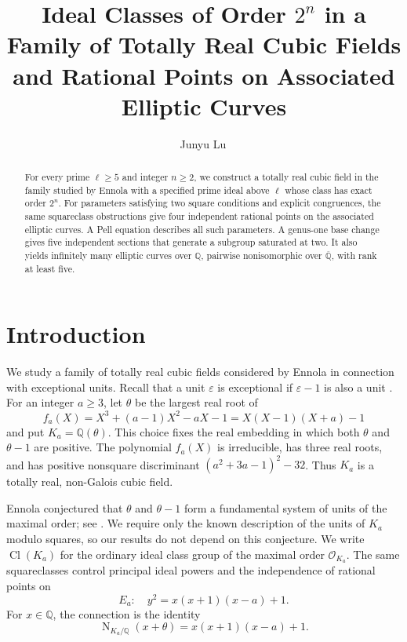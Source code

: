 \documentclass[11pt,leqno,oneside,letterpaper]{amsart}
\title[Ideal classes and rational points]{Ideal Classes of Order $2^n$ in a Family of Totally Real Cubic Fields and Rational Points on Associated Elliptic Curves}
\author{Junyu Lu\,\orcidlink{0009-0001-4973-3198}}
\date{}
\theoremstyle{remark}
\numberwithin{equation}{section}
\newcommand{\Q}{\mathbb Q}
\DeclareMathOperator{\Cl}{Cl}
\DeclareMathOperator{\Nm}{N}
\begin{document}
\begin{abstract}
  For every prime $\ell\geq5$ and integer $n\geq2$, we construct a totally real cubic field in the family studied by Ennola with a specified prime ideal above $\ell$ whose class has exact order $2^n$. For parameters satisfying two square conditions and explicit congruences, the same squareclass obstructions give four independent rational points on the associated elliptic curves. A Pell equation describes all such parameters. A genus-one base change gives five independent sections that generate a subgroup saturated at two. It also yields infinitely many elliptic curves over $\Q$, pairwise nonisomorphic over $\overline{\Q}$, with rank at least five.
\end{abstract}
\maketitle


\section{Introduction}

We study a family of totally real cubic fields considered by Ennola in connection with exceptional units. Recall that a unit $\varepsilon$ is exceptional if $\varepsilon-1$ is also a unit \cite{Ennola1991,Louboutin2017}. For an integer $a\geq3$, let $\theta$ be the largest real root of
\[
  f_a(X)=X^3+(a-1)X^2-aX-1=X(X-1)(X+a)-1
\]
and put $K_a=\Q(\theta)$. This choice fixes the real embedding in which both $\theta$ and $\theta-1$ are positive. The polynomial $f_a(X)$ is irreducible, has three real roots, and has positive nonsquare discriminant $(a^2+3a-1)^2-32$. Thus $K_a$ is a totally real, non-Galois cubic field.

Ennola conjectured that $\theta$ and $\theta-1$ form a fundamental system of units of the maximal order; see \cite{Ennola1991,Louboutin2017,ChoiKim2025}. We require only the known description of the units of $K_a$ modulo squares, so our results do not depend on this conjecture. We write $\Cl(K_a)$ for the ordinary ideal class group of the maximal order $\mathcal O_{K_a}$. The same squareclasses control principal ideal powers and the independence of rational points on
\begin{equation}\label{eq:elliptic}
  E_a:\quad y^2=x(x+1)(x-a)+1.
\end{equation}
For $x\in\Q$, the connection is the identity
\begin{equation}\label{eq:common-norm}
  \Nm_{K_a/\Q}(x+\theta)=x(x+1)(x-a)+1.
\end{equation}
\end{document}
